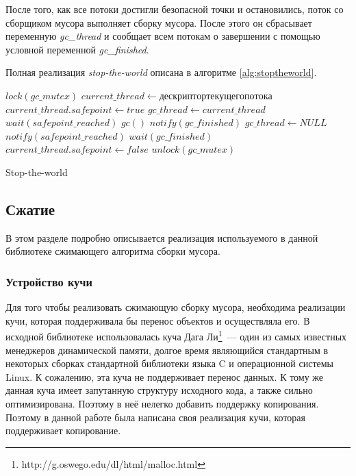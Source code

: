 После того, как все потоки достигли безопасной точки и остановились, поток со сборщиком мусора выполняет сборку мусора. После этого он сбрасывает переменную \textit{gc\_thread} и сообщает всем потокам о завершении с помощью условной переменной \textit{gc\_finished}.

Полная реализация \textit{stop-the-world} описана в алгоритме \ref{alg:stoptheworld}.

\begin{algorithm}[h]
\begin{algorithmic}[1]
\State $lock(gc\_mutex)$
\State $current\_thread \gets дескриптор текущего потока$ 
\State $current\_thread.safepoint \gets true$
    \State $gc\_thread \gets current\_thread$
            \State $wait(safepoint\_reached)$
        \EndIf
    \EndFor
    \State $gc()$
    \State $notify(gc\_finished)$
    \State $gc\_thread \gets NULL$
\Else
    \State $notify(safepoint\_reached)$
    \State $wait(gc\_finished)$
\EndIf
\State $current\_thread.safepoint \gets false$
\State $unlock(gc\_mutex)$
\end{algorithmic}
\caption{Stop-the-world}\label{alg:stoptheworld}
\end{algorithm}
\subsection{Сжатие}
В этом разделе подробно описывается реализация используемого в данной библиотеке сжимающего алгоритма сборки мусора.
\subsubsection{Устройство кучи}
Для того чтобы реализовать сжимающую сборку мусора, необходима реализации кучи, которая поддерживала бы перенос объектов и осуществляла его. В исходной библиотеке использовалась куча Дага Ли\footnote{http://g.oswego.edu/dl/html/malloc.html}~--- один из самых известных менеджеров динамической памяти, долгое время являющийся стандартным в некоторых сборках стандартной библиотеки языка C и операционной системы Linux. К сожалению, эта куча не поддерживает перенос данных. К тому же данная куча имеет запутанную структуру исходного кода, а также сильно оптимизирована. Поэтому в неё нелегко добавить поддержку копирования. Поэтому в данной работе была написана своя реализация кучи, которая поддерживает копирование.

